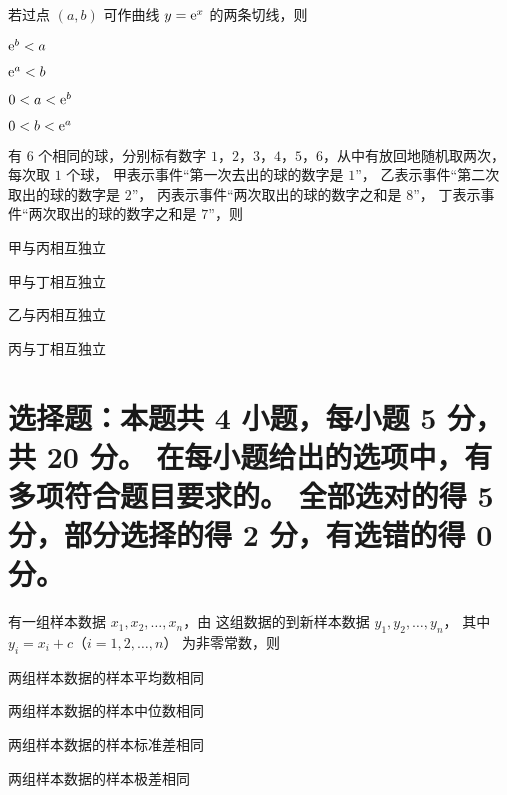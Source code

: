 \documentclass[zihao = -4]{exam-zh}
\begin{document}
\begin{question}
  若过点 $(a, b)$ 可作曲线 $y = \mathrm{ e }^x$ 的两条切线，则 \paren
  \begin{choices}
    \item $\mathrm{ e }^b < a$
    \item $\mathrm{ e }^a < b$
    \item $0 < a < \mathrm{ e }^b$
    \item $0 < b < \mathrm{ e }^a$
  \end{choices}
\end{question}

\begin{question}
  有 $6$ 个相同的球，分别标有数字 $1$，$2$，$3$，$4$，$5$，$6$，从中有放回地随机取两次，每次取 $1$ 个球，
  甲表示事件“第一次去出的球的数字是 $1$”，
  乙表示事件“第二次取出的球的数字是 $2$”，
  丙表示事件“两次取出的球的数字之和是 $8$”，
  丁表示事件“两次取出的球的数字之和是 $7$”，则 \paren
  \begin{choices}
    \item 甲与丙相互独立
    \item 甲与丁相互独立
    \item 乙与丙相互独立
    \item 丙与丁相互独立
  \end{choices}
\end{question}



\section{%
  选择题：本题共 4 小题，每小题 5 分，共 20 分。
  在每小题给出的选项中，有多项符合题目要求的。
  全部选对的得 5 分，部分选择的得 2 分，有选错的得 0 分。
}

\begin{question}
  有一组样本数据 $x_1, x_2, \dots, x_n$，由 这组数据的到新样本数据 $y_1, y_2, \dots, y_n$，
  其中 $y_i = x_i + c$（$i = 1, 2, \dots, n$） 为非零常数，则 \paren
  \begin{choices}
    \item 两组样本数据的样本平均数相同
    \item 两组样本数据的样本中位数相同
    \item 两组样本数据的样本标准差相同
    \item 两组样本数据的样本极差相同
  \end{choices}
\end{question}
\end{document}
